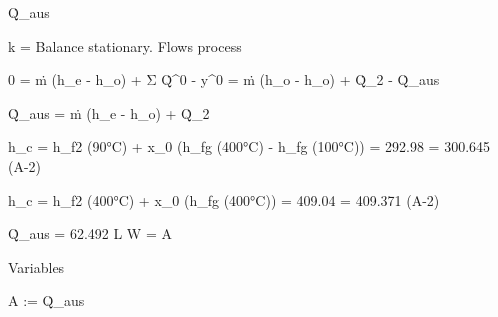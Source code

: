Q̇_aus

k = Balance stationary. Flows process

0 = ṁ (h_e - h_o) + Σ Q̇^0 - y^0 = ṁ (h_o - h_o) + Q̇_2 - Q̇_aus

Q̇_aus = ṁ (h_e - h_o) + Q̇_2

h_c = h_f2 (90°C) + x_0 (h_fg (400°C) - h_fg (100°C)) = 292.98 = 300.645 (A-2)

h_c = h_f2 (400°C) + x_0 (h_fg (400°C)) = 409.04 = 409.371 (A-2)

Q̇_aus = 62.492 L W  = A

Variables

A := Q̇_aus